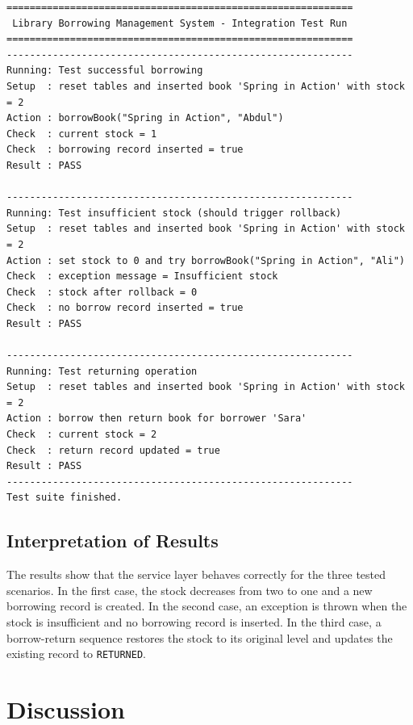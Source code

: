 \documentclass[12pt,a4paper]{report}
\begin{document}
\begin{lstlisting}[style=reportcode]
============================================================
 Library Borrowing Management System - Integration Test Run
============================================================
------------------------------------------------------------
Running: Test successful borrowing
Setup  : reset tables and inserted book 'Spring in Action' with stock = 2
Action : borrowBook("Spring in Action", "Abdul")
Check  : current stock = 1
Check  : borrowing record inserted = true
Result : PASS

------------------------------------------------------------
Running: Test insufficient stock (should trigger rollback)
Setup  : reset tables and inserted book 'Spring in Action' with stock = 2
Action : set stock to 0 and try borrowBook("Spring in Action", "Ali")
Check  : exception message = Insufficient stock
Check  : stock after rollback = 0
Check  : no borrow record inserted = true
Result : PASS

------------------------------------------------------------
Running: Test returning operation
Setup  : reset tables and inserted book 'Spring in Action' with stock = 2
Action : borrow then return book for borrower 'Sara'
Check  : current stock = 2
Check  : return record updated = true
Result : PASS
------------------------------------------------------------
Test suite finished.
\end{lstlisting}

\section{Interpretation of Results}
The results show that the service layer behaves correctly for the three tested scenarios. In the first case, the stock decreases from two to one and a new borrowing record is created. In the second case, an exception is thrown when the stock is insufficient and no borrowing record is inserted. In the third case, a borrow-return sequence restores the stock to its original level and updates the existing record to \texttt{RETURNED}.

\chapter{Discussion}
\end{document}
